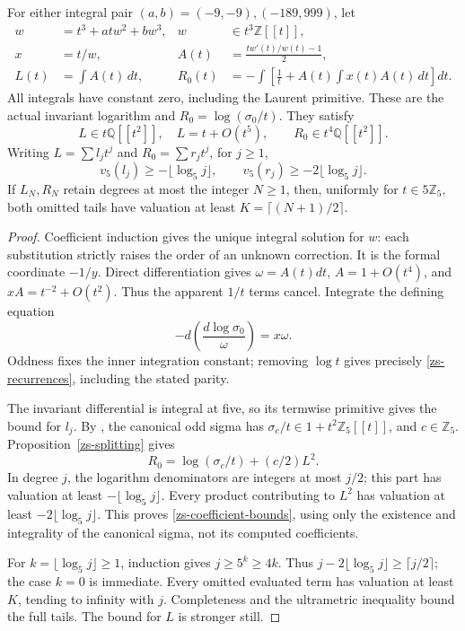 \begin{proposition}
\label{zs-tail}
For either integral pair \((a,b)=(-9,-9),(-189,999)\), let
\begin{align}
 w&=t^3+atw^2+bw^3,&w&\in t^3\mathbb Z[[t]],\\
 x&=t/w,&A(t)&=\frac{tw'(t)/w(t)-1}{2},\\
 L(t)&=\int A(t)\,dt,&
 R_0(t)&=-\int\left[\frac1t+A(t)\int x(t)A(t)\,dt\right]dt.
 \label{zs-recurrences}
\end{align}
All integrals have constant zero, including the Laurent primitive.
These are the actual invariant logarithm and
\(R_0=\log(\sigma_0/t)\). They satisfy
\[
 L\in t\mathbb Q[[t^2]],\quad L=t+O(t^5),\qquad
 R_0\in t^4\mathbb Q[[t^2]].
\]
Writing \(L=\sum l_jt^j\) and \(R_0=\sum r_jt^j\), for \(j\ge1\),
\begin{equation}
 v_5(l_j)\ge-\lfloor\log_5j\rfloor,\qquad
 v_5(r_j)\ge-2\lfloor\log_5j\rfloor.
 \label{zs-coefficient-bounds}
\end{equation}
If \(L_N,R_N\) retain degrees at most the integer \(N\ge1\), then,
uniformly for \(t\in5\mathbb Z_5\), both omitted tails have valuation
at least \(K=\lceil(N+1)/2\rceil\).
\end{proposition}
\begin{proof}
Coefficient induction gives the unique integral solution for \(w\):
each substitution strictly raises the order of an unknown correction.
It is the formal coordinate \(-1/y\). Direct differentiation gives
\(\omega=A(t)dt\), \(A=1+O(t^4)\), and
\(xA=t^{-2}+O(t^2)\). Thus the apparent \(1/t\) terms cancel.
Integrate the defining equation
\[
 -d\left(\frac{d\log\sigma_0}{\omega}\right)=x\omega.
\]
Oddness fixes the inner integration constant; removing \(\log t\)
gives precisely \eqref{zs-recurrences}, including the stated parity.

The invariant differential is integral at five, so its termwise
primitive gives the bound for \(l_j\). By
\cite[Theorem~1.3]{MazurSteinTateHeight}, the canonical odd sigma has
\(\sigma_c/t\in1+t^2\mathbb Z_5[[t]]\), and \(c\in\mathbb Z_5\).
Proposition~\ref{zs-splitting} gives
\[
 R_0=\log(\sigma_c/t)+(c/2)L^2.
\]
In degree \(j\), the logarithm denominators are integers at most
\(j/2\); this part has valuation at least
\(-\lfloor\log_5j\rfloor\). Every product contributing to \(L^2\)
has valuation at least \(-2\lfloor\log_5j\rfloor\).
This proves \eqref{zs-coefficient-bounds}, using only the existence
and integrality of the canonical sigma, not its computed coefficients.

For \(k=\lfloor\log_5j\rfloor\ge1\), induction gives
\(j\ge5^k\ge4k\). Thus
\(j-2\lfloor\log_5j\rfloor\ge\lceil j/2\rceil\); the case \(k=0\)
is immediate. Every omitted evaluated term has valuation at least
\(K\), tending to infinity with \(j\). Completeness and the
ultrametric inequality bound the full tails. The bound for \(L\)
is stronger still.
\end{proof}

